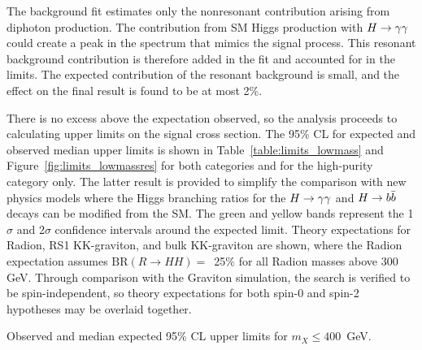 The background fit estimates only the nonresonant contribution arising from diphoton
production. The contribution from SM Higgs production with $H\to\gamma\gamma$ could create a peak in the
spectrum that mimics the signal process. This resonant background
contribution is therefore added in the fit and accounted for in the limits.
The expected contribution of the resonant background is small, and the
effect on the final result is found to be at most 2\%.

There is no excess above the expectation observed, so the analysis proceeds to calculating
upper limits on the signal cross section.
The 95\% CL for expected and observed median upper limits is shown in
Table~\ref{table:limits_lowmass} and Figure~\ref{fig:limits_lowmassres}
for both categories and for the high-purity category only.
The latter result is provided to simplify the comparison with new physics models where
the Higgs branching ratios for the $H\to\gamma\gamma$ and $H\to b\bar{b}$ decays can be modified from the SM.
The green and yellow bands represent the 1$\sigma$ and 2$\sigma$
confidence intervals around the expected limit. Theory expectations for Radion, RS1 KK-graviton, and 
bulk KK-graviton are shown, where the Radion expectation assumes $\text{BR}(R\rightarrow HH) =$~25\%
for all Radion masses above 300 GeV. Through comparison with the Graviton simulation,
the search is verified to be spin-independent, so theory expectations for both spin-0 and spin-2
hypotheses may be overlaid together.

\begin{table}[ht]
  \centering
  \renewcommand{\arraystretch}{1.4}
  \caption{Observed and median expected 95\% CL upper limits for $m_X \le 400$~GeV.}
  
  \label{table:limits_lowmass}
\end{table}

